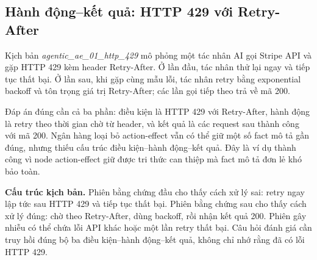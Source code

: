 \documentclass[../main.tex]{subfiles}
\begin{document}
\subsection{Hành động--kết quả: HTTP 429 với Retry-After}
\label{app:success_http_429}

Kịch bản \textit{agentic\_ae\_01\_http\_429} mô phỏng một tác nhân AI gọi Stripe API và gặp HTTP 429 kèm header Retry-After. Ở lần đầu, tác nhân thử lại ngay và tiếp tục thất bại. Ở lần sau, khi gặp cùng mẫu lỗi, tác nhân retry bằng exponential backoff và tôn trọng giá trị Retry-After; các lần gọi tiếp theo trả về mã 200.

Đáp án đúng cần cả ba phần: điều kiện là HTTP 429 với Retry-After, hành động là retry theo thời gian chờ từ header, và kết quả là các request sau thành công với mã 200. Ngân hàng loại bỏ action-effect vẫn có thể giữ một số fact mô tả gần đúng, nhưng thiếu cấu trúc điều kiện--hành động--kết quả. Đây là ví dụ thành công vì node action-effect giữ được tri thức can thiệp mà fact mô tả đơn lẻ khó bảo toàn.

\textbf{Cấu trúc kịch bản.} Phiên bằng chứng đầu cho thấy cách xử lý sai: retry ngay lập tức sau HTTP 429 và tiếp tục thất bại. Phiên bằng chứng sau cho thấy cách xử lý đúng: chờ theo Retry-After, dùng backoff, rồi nhận kết quả 200. Phiên gây nhiễu có thể chứa lỗi API khác hoặc một lần retry thất bại. Câu hỏi đánh giá cần truy hồi đúng bộ ba điều kiện--hành động--kết quả, không chỉ nhớ rằng đã có lỗi HTTP 429.
\end{document}
